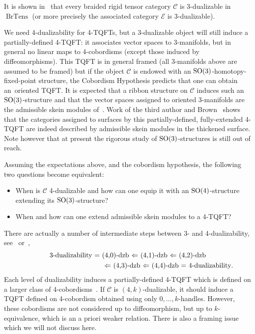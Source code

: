 \documentclass[pdftex]{sigma}
\numberwithin{equation}{section}
\numberwithin{theorem}{section}
\numberwithin{proposition}{section}
\numberwithin{definition}{section}
\numberwithin{lemma}{section}
\numberwithin{corollary}{section}
\numberwithin{remark}{section}
\numberwithin{example}{section}
\newcommand{\CC}{\mathcal{C}}
\newcommand{\EE}{\mathcal{E}}
\begin{document}
It is shown in~\cite{BJS} that every braided rigid tensor category $\CC$ is
3-dualizable in $\operatorname{BrTens}$
(or more precisely the associated category $\EE$ is 3-dualizable).

We need 4-dualizability for 4-TQFTs, but a 3-dualizable object will still induce a partially-defined 4-TQFT: it
associates
vector spaces to 3-manifolds, but
in general no
linear maps to 4-cobordisms (except those induced by diffeomorphisms). This TQFT is in general framed (all 3-manifolds above are assumed to be framed) but if the object $\CC$ is endowed with an ${\rm SO}(3)$-homotopy-fixed-point structure, the Cobordism Hypothesis predicts that one can obtain an~oriented TQFT. It is expected that a ribbon structure on $\CC$ induces such an ${\rm SO}(3)$-structure and that the vector spaces assigned to oriented 3-manifolds are the admissible skein modules of~\cite{CGP22}. Work of the third author and Brown~\cite{BH} shows that the categories assigned to surfaces by this partially-defined, fully-extended 4-TQFT are indeed described by admissible skein modules in the thickened surface.
Note however that at present the rigorous study of ${\rm SO}(3)$-structures is still out of reach.

Assuming the expectations above, and the cobordism hypothesis, the following two questions become equivalent:
\begin{itemize}\itemsep=0pt
\item When is $\CC$ 4-dualizable and how can one equip it with an ${\rm SO}(4)$-structure extending its ${\rm SO}(3)$-structure?
\item When and how can one extend admissible skein modules to a 4-TQFT?
\end{itemize}
There are actually a number of intermediate steps between 3- and 4-dualizability, see~\cite[Definition~2.25]{Haioun} or~\cite{Lurie},
\begin{gather*}
 \text{3-dualizability = (4,0)-dzb $\Leftarrow$ (4,1)-dzb $\Leftarrow$ (4,2)-dzb}\\
 \hphantom{\text{3-dualizability = (4,0)-dzb }}{}
 \text{$\Leftarrow$ (4,3)-dzb $\Leftarrow$ (4,4)-dzb = 4-dualizability}.
\end{gather*}
Each
level of
dualizability
induces a partially-defined
4-TQFT
which is defined on a
larger
class of 4-cobordisms~\cite[Section~3.4]{Lurie}. If $\CC$ is $(4,k)$-dualizable, it should induce a TQFT defined
on
4-cobordism obtained using only $0,\dots, k$-handles. However, these cobordisms are not considered up to diffeomorphism, but up to $k$-equivalence, which is an a priori weaker relation. There is also a framing issue which we will not discuss here.
\end{document}
